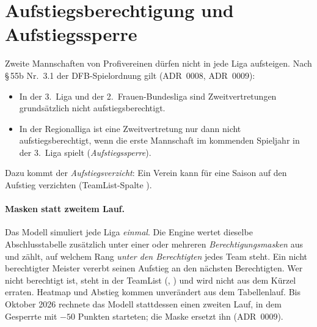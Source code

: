 \section{Aufstiegsberechtigung und Aufstiegssperre}\label{sec:malus}

Zweite Mannschaften von Profivereinen dürfen nicht in jede Liga aufsteigen.
Nach §\,55b Nr.~3.1 der DFB-Spielordnung gilt (ADR~0008, ADR~0009):

\begin{itemize}
  \item In der 3.~Liga und der 2.~Frauen-Bundesliga sind Zweitvertretungen
        grundsätzlich nicht aufstiegsberechtigt.
  \item In der Regionalliga ist eine Zweitvertretung nur dann nicht
        aufstiegsberechtigt, wenn die erste Mannschaft im kommenden Spieljahr
        in der 3.~Liga spielt (\emph{Aufstiegssperre}).
\end{itemize}

Dazu kommt der \emph{Aufstiegsverzicht}: Ein Verein kann für eine Saison auf
den Aufstieg verzichten (TeamList-Spalte ).

\paragraph{Masken statt zweitem Lauf.} Das Modell simuliert jede Liga
\emph{einmal}. Die Engine wertet dieselbe Abschlusstabelle zusätzlich unter
einer oder mehreren \emph{Berechtigungsmasken} aus und zählt, auf welchem Rang
\emph{unter den Berechtigten} jedes Team steht. Ein nicht berechtigter Meister
vererbt seinen Aufstieg an den nächsten Berechtigten. Wer nicht berechtigt ist,
steht in der TeamList (, ) und wird
nicht aus dem Kürzel erraten. Heatmap und Abstieg kommen unverändert aus dem
Tabellenlauf. Bis Oktober 2026 rechnete das Modell stattdessen einen zweiten
Lauf, in dem Gesperrte mit $-50$ Punkten starteten; die Maske ersetzt ihn
(ADR~0009).

